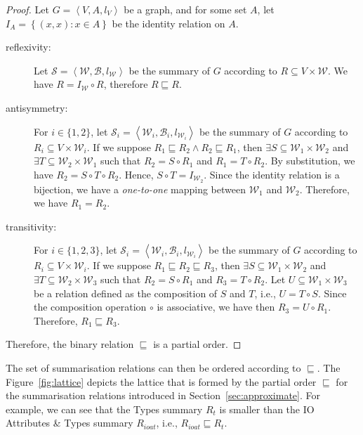 \begin{proof}
	Let $G=\left\langle V, A, l_V \right\rangle$ be a graph, and for some set $A$, let $I_A = \left\lbrace (x, x) : x \in A \right\rbrace$ be the identity relation on $A$.
	\begin{description}
		\item[reflexivity:] Let $\mathcal{S} = \left\langle \mathcal{W}, \mathcal{B}, l_{\mathcal{W}} \right\rangle$ be the summary of $G$ according to $R \subseteq V \times \mathcal{W}$. We have $R = I_\mathcal{W} \circ R$, therefore $R \sqsubseteq R$.
		\item[antisymmetry:] For $i \in \{1, 2\}$, let $\mathcal{S}_i = \left\langle \mathcal{W}_i, \mathcal{B}_i, l_{\mathcal{W}_i} \right\rangle$ be the summary of $G$ according to $R_i \subseteq V \times \mathcal{W}_i$. If we suppose $R_1 \sqsubseteq R_2 \wedge R_2 \sqsubseteq R_1$, then $\exists S \subseteq \mathcal{W}_1 \times \mathcal{W}_2$ and $\exists T \subseteq \mathcal{W}_2 \times \mathcal{W}_1$ such that $R_2 = S \circ R_1$ and $R_1 = T \circ R_2$. By substitution, we have $R_2 = S \circ T \circ R_2$. Hence, $S \circ T = I_{\mathcal{W}_2}$. Since the identity relation is a bijection, we have a \emph{one-to-one} mapping between $\mathcal{W}_1$ and $\mathcal{W}_2$. Therefore, we have $R_1 = R_2$.
		\item[transitivity:] For $i \in \{1, 2, 3\}$, let $\mathcal{S}_i = \left\langle \mathcal{W}_i, \mathcal{B}_i, l_{\mathcal{W}_i} \right\rangle$ be the summary of $G$ according to $R_i \subseteq V \times \mathcal{W}_i$. If we suppose $R_1 \sqsubseteq R_2 \sqsubseteq R_3$, then $\exists S \subseteq \mathcal{W}_1 \times \mathcal{W}_2$ and $\exists T \subseteq \mathcal{W}_2 \times \mathcal{W}_3$ such that $R_2 = S \circ R_1$ and $R_3 = T \circ R_2$. Let $U \subseteq \mathcal{W}_1 \times \mathcal{W}_3$ be a relation defined as the composition of $S$ and $T$, i.e., $U = T \circ S$. Since the composition operation $\circ$ is associative, we have then $R_3 = U \circ R_1$. Therefore, $R_1 \sqsubseteq R_3$.
	\end{description}
	Therefore, the binary relation $\sqsubseteq$ is a partial order.
\end{proof}

The set of summarisation relations can then be ordered according to $\sqsubseteq$. The Figure~\ref{fig:lattice} depicts the lattice that is formed by the partial order $\sqsubseteq$ for the summarisation relations introduced in Section~\ref{sec:approximate}. For example, we can see that the Types summary $R_t$ is smaller than the IO Attributes \& Types summary $R_{ioat}$, i.e., $R_{ioat} \sqsubseteq R_t$.

